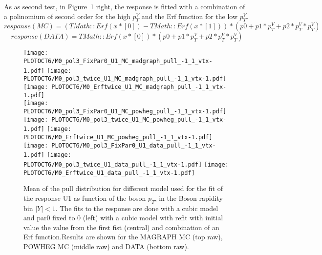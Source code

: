 \documentclass[41pt,a4paper,oneside]{report}
\begin{document}
As as second test, in Figure~\ref{fig:BIASpull} right, the response is fitted with a combination of a polinomium of second order for the high $p^{V}_{T}$ and the Erf function for the low $p^{V}_{T}$.
\begin{equation}
response (MC) =(TMath::Erf(x*[0]) - TMath::Erf(x*[1]) )*(p0 + p1 * p^{V}_{T} + p2 * p^{V}_{T} * p^{V}_{T})
\end{equation}
\begin{equation}
response (DATA) =TMath::Erf(x*[0])*(p0 + p1 * p^{V}_{T} + p2 * p^{V}_{T} * p^{V}_{T})
\end{equation}
{\color{magenta}{Need to add some explanation on the difference in the DATA and MC Erf.}}

\begin{figure}[h!]
  \begin{center}

    \texttt{[image: PLOTOCT6/M0\_pol3\_FixPar0\_U1\_MC\_madgraph\_pull\_-1\_1\_vtx-1.pdf]}
    \texttt{[image: PLOTOCT6/M0\_pol3\_twice\_U1\_MC\_madgraph\_pull\_-1\_1\_vtx-1.pdf]}
    \texttt{[image: PLOTOCT6/M0\_Erftwice\_U1\_MC\_madgraph\_pull\_-1\_1\_vtx-1.pdf]}\\

    \texttt{[image: PLOTOCT6/M0\_pol3\_FixPar0\_U1\_MC\_powheg\_pull\_-1\_1\_vtx-1.pdf]}
    \texttt{[image: PLOTOCT6/M0\_pol3\_twice\_U1\_MC\_powheg\_pull\_-1\_1\_vtx-1.pdf]}
    \texttt{[image: PLOTOCT6/M0\_Erftwice\_U1\_MC\_powheg\_pull\_-1\_1\_vtx-1.pdf]}\\

    \texttt{[image: PLOTOCT6/M0\_pol3\_FixPar0\_U1\_data\_pull\_-1\_1\_vtx-1.pdf]}
    \texttt{[image: PLOTOCT6/M0\_pol3\_twice\_U1\_data\_pull\_-1\_1\_vtx-1.pdf]}
    \texttt{[image: PLOTOCT6/M0\_Erftwice\_U1\_data\_pull\_-1\_1\_vtx-1.pdf]}\\

    \caption{Mean of the pull distribution for different model used for the fit of the response U1 as function of the boson $p_{T}$, in the Boson rapidity bin $|Y|<1$.
 The fits to the response are done with a cubic model and par0 fixed to 0 (left) with a cubic model with refit with initial value the value from the first fist (central) and combination of an Erf function.Results are shown for the MAGRAPH MC (top raw), POWHEG MC (middle raw) and DATA (bottom raw).
{\color{magenta}{Plot on the right with one ERF for both data and powheg and madgraph, for powheg the second time fit failed.}}
}
    \label{fig:BIASpull}
  \end{center}
\end{figure}
\end{document}

